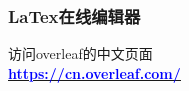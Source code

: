 \begin{frame}[fragile]
\frametitle{LaTex在线编辑器}
\vspace*{1cm}
访问overleaf的中文页面 \\
\vspace*{4cm}
\centering
\underline{\Huge \textbf{\href{https://cn.overleaf.com/}{\textcolor{blue}{https://cn.overleaf.com/}}}} \\

\end{frame}
